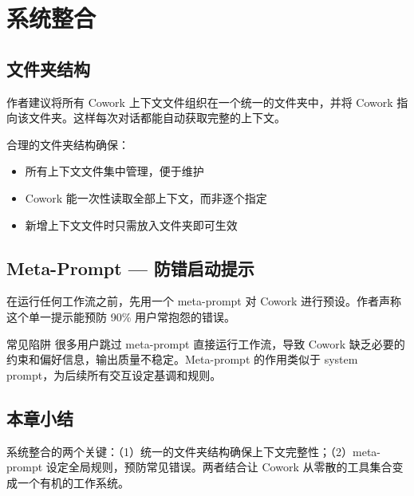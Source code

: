 \section{系统整合}

\subsection{文件夹结构}

作者建议将所有 Cowork 上下文文件组织在一个统一的文件夹中，并将 Cowork 指向该文件夹。这样每次对话都能自动获取完整的上下文。

合理的文件夹结构确保：
\begin{itemize}
    \item 所有上下文文件集中管理，便于维护
    \item Cowork 能一次性读取全部上下文，而非逐个指定
    \item 新增上下文文件时只需放入文件夹即可生效
\end{itemize}

\subsection{Meta-Prompt --- 防错启动提示}

在运行任何工作流之前，先用一个 meta-prompt 对 Cowork 进行预设。作者声称这个单一提示能预防 90\% 用户常抱怨的错误。

\begin{warningbox}{常见陷阱}
很多用户跳过 meta-prompt 直接运行工作流，导致 Cowork 缺乏必要的约束和偏好信息，输出质量不稳定。Meta-prompt 的作用类似于 system prompt，为后续所有交互设定基调和规则。
\end{warningbox}

\subsection{本章小结}

系统整合的两个关键：（1）统一的文件夹结构确保上下文完整性；（2）meta-prompt 设定全局规则，预防常见错误。两者结合让 Cowork 从零散的工具集合变成一个有机的工作系统。

